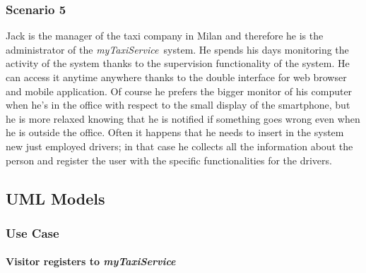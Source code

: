 \documentclass[a4paper,11pt]{report} %
\newcommand{\mts}{\mbox{\normalfont\itshape myTaxiService\ }}
\begin{document}
	\subsubsection{Scenario 5} Jack is the manager of the taxi company in Milan and therefore he is the administrator of the \mts system. He spends his days monitoring the activity of the system thanks to the supervision functionality of the system. He can access it anytime anywhere thanks to the double interface for web browser and mobile application. Of course he prefers the bigger monitor of his computer when he’s in the office with respect to the small display of the smartphone, but he is more relaxed knowing that he is notified if something goes wrong even when he is outside the office. Often it happens that he needs to insert in the system new just employed drivers; in that case he collects all the information about the person and register the user with the specific functionalities for the drivers.
	
	\subsection{UML Models}
	
	\subsubsection{Use Case}
	\renewcommand{\arraystretch}{1.5}
	\setlength{\tabcolsep}{6pt}
	\paragraph{Visitor registers to \mts}
	
\end{document}
